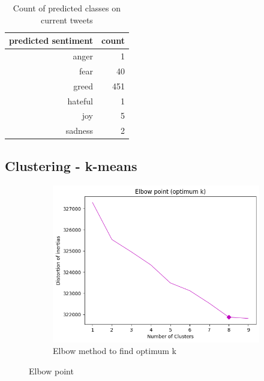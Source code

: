 \documentclass[a4paper, 12pt]{article}
\begin{document}
\begin{table}[H]
\begin{center}
    \begin{tabular}{| r | r |}
        \hline
        predicted sentiment & count  \\ \hline
        anger   &  1  \\ \hline
				fear	  & 40 	\\ \hline
				greed	  & 451 \\ \hline
				hateful	& 1   \\ \hline
				joy			 & 5  \\ \hline
				sadness  & 2	\\ \hline
    \end{tabular}
    \caption{Count of predicted classes on current tweets}
    \label{tab:counter}
\end{center}
\end{table}

\subsection{Clustering - k-means}

\begin{figure}[H]
    \centering
    \begin{subfigure}[a]{0.9\textwidth}
        \includegraphics[width=\textwidth]{res/elbow.png}
        \caption{Elbow method to find optimum k}
    \end{subfigure}
		\caption{Elbow point}
		\label{fig:elbow}
\end{figure}
\end{document}
